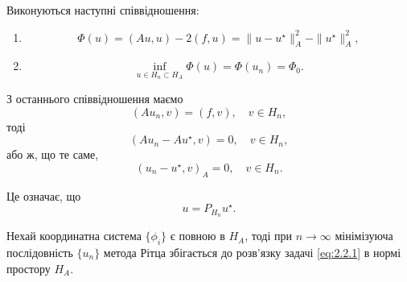 \begin{theorem}
    Виконуються наступні співвідношення:
    \begin{enumerate}
        \item \begin{equation}
            \label{eq:2.3.3}
            \Phi(u) = (A u, u) - 2 (f, u) = \|u - u^\star\|_A^2 - \|u^\star\|_A^2,
        \end{equation}
        
        \item \begin{equation}
            \label{eq:2.3.4}
            \inf_{u \in H_n \subset H_A} \Phi(u) = \Phi(u_n) = \Phi_0.
        \end{equation}
    \end{enumerate}
\end{theorem}

З останнього співвідношення маємо
\begin{equation}
    \label{eq:2.3.5}
    (A u_n, v) = (f, v), \quad v \in H_n,
\end{equation}
тоді
\begin{equation}
    \label{eq:2.3.6}
    (A u_n - A u^\star, v) = 0, \quad v \in H_n,
\end{equation}
або ж, що те саме,
\begin{equation}
    \label{eq:2.3.7}
    (u_n - u^\star, v)_A = 0, \quad v \in H_n.
\end{equation}

Це означає, що
\begin{equation}
    \label{eq:2.3.8}
    u = P_{H_n} u^\star.
\end{equation}

\begin{theorem}
    Нехай координатна система $\{\phi_i\}$ є повною в $H_A$, тоді при $n \to \infty$ мінімізуюча послідовність $\{u_n\}$ метода Рітца збігається до розв'язку задачі \eqref{eq:2.2.1} в нормі простору $H_A$.
\end{theorem}

